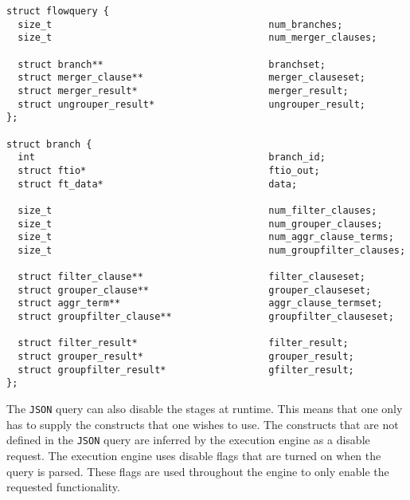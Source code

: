 \begin{lstlisting}
struct flowquery {
  size_t                                      num_branches;
  size_t                                      num_merger_clauses;

  struct branch**                             branchset;
  struct merger_clause**                      merger_clauseset;
  struct merger_result*                       merger_result;
  struct ungrouper_result*                    ungrouper_result;
};

struct branch {
  int                                         branch_id;
  struct ftio*                                ftio_out;
  struct ft_data*                             data;

  size_t                                      num_filter_clauses;
  size_t                                      num_grouper_clauses;
  size_t                                      num_aggr_clause_terms;
  size_t                                      num_groupfilter_clauses;

  struct filter_clause**                      filter_clauseset;
  struct grouper_clause**                     grouper_clauseset;
  struct aggr_term**                          aggr_clause_termset;
  struct groupfilter_clause**                 groupfilter_clauseset;

  struct filter_result*                       filter_result;
  struct grouper_result*                      grouper_result;
  struct groupfilter_result*                  gfilter_result;
};
\end{lstlisting}

The \texttt{JSON} query can also disable the stages at runtime.  This means
that one only has to supply the constructs that one wishes to use.  The
constructs that are not defined in the \texttt{JSON} query are inferred by the
execution engine as a disable request. The execution engine uses disable flags
that are turned on when the query is parsed. These flags are used throughout
the engine to only enable the requested functionality.


